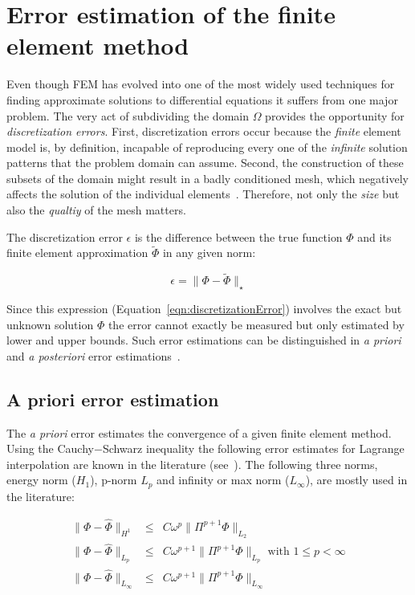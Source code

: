 \section{Error estimation of the finite element method}
\label{sec:errorEstimationOfTheFiniteelementMethod}
Even though FEM has evolved into one of the most widely used techniques for finding approximate solutions to differential equations it suffers from one major problem. The very act of subdividing the domain $\Omega$ provides the opportunity for \emph{discretization errors}. First, discretization errors occur because the \emph{finite} element model is, by definition, incapable of reproducing every one of the \emph{infinite} solution patterns that the problem domain can assume. Second, the construction of these subsets of the domain might result in a badly conditioned mesh, which negatively affects the solution of the individual elements~\cite{Cheng2012}. Therefore, not only the \emph{size} but also the \emph{qualtiy} of the mesh matters.

The discretization error $\epsilon$ is the difference between the true function $\Phi$ and its finite element approximation $\tilde{\Phi}$ in any given norm:

\begin{equation}
	\epsilon = \|\Phi - \tilde{\Phi}\|_{\star}
	\label{eqn:discretizationError} 
\end{equation}

Since this expression (Equation~\ref{eqn:discretizationError}) involves the exact but unknown solution $\Phi$ the error cannot exactly be measured but only estimated by lower and upper bounds. Such error estimations can be distinguished in \emph{a priori} and \emph{a posteriori} error estimations~\cite{Dow1998,Kunert1998}. 

\subsection{A priori error estimation}
\label{subsec:aPrioriErrorEstimation}
The \emph{a priori} error estimates the convergence of a given finite element method. Using the Cauchy$-$Schwarz inequality the following error estimates for Lagrange interpolation are known in the literature (see~\cite{Ciarlet1978,Brenner2008}). The following three norms, energy norm ($H_{1}$), p-norm $L_{p}$ and infinity or max norm ($L_{\infty}$), are mostly used in the literature:

\begin{eqnarray}
	\|\Phi - \hat{\Phi}\|_{H^{1}} &\leq & C\omega^{p}\|\Pi^{p+1}\Phi\|_{L_{2}} \label{eqn:energyNorm}\\
	\|\Phi - \hat{\Phi}\|_{L_{p}} &\le & C\omega^{p+1}\|\Pi^{p+1}\Phi\|_{L_{p}} \text{ with } 1 \leq p < \infty \label{eqn:pNorm}\\
	\|\Phi - \hat{\Phi}\|_{L_{\infty}} &\leq & C\omega^{p+1}\|\Pi^{p+1}\Phi\|_{L_{\infty}} \label{eqn:infinityNorm}
\end{eqnarray}

